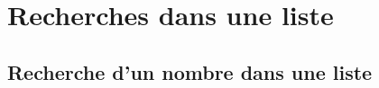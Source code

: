 \documentclass[10pt]{article}
\begin{document}


\setlength{\parskip}{0ex plus 0.2ex minus 0ex}
 \renewcommand{\contentsname}{}
 \renewcommand{\baselinestretch}{1}

\tableofcontents

 \renewcommand{\baselinestretch}{1.2}
\setlength{\parskip}{2ex plus 0.5ex minus 0.2ex}

\newpage


\section{Recherches dans une liste}
\subsection{Recherche d'un nombre dans une liste}

\end{document}
